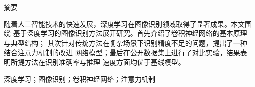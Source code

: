 \begin{center}
  {\heiti 摘\quad\quad 要}
\end{center}

\quad 随着人工智能技术的快速发展，深度学习在图像识别领域取得了显著成果。本文围绕
基于深度学习的图像识别方法展开研究。首先介绍了卷积神经网络的基本原理与典型结构；
其次针对传统方法在复杂场景下识别精度不足的问题，提出了一种结合注意力机制的改进
网络模型；最后在公开数据集上进行了对比实验，结果表明所提方法在识别准确率与推理
速度方面均优于基线模型。

\vspace{0.6em}
深度学习；图像识别；卷积神经网络；注意力机制
